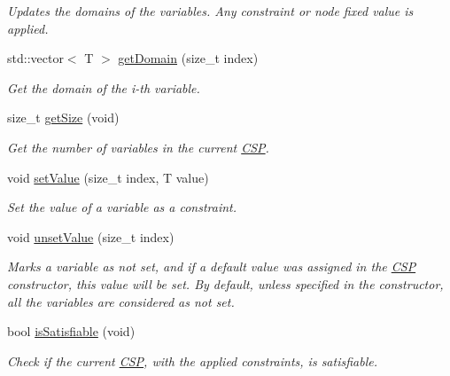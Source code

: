 \begin{DoxyCompactItemize}
\begin{DoxyCompactList}\small\item\em Updates the domains of the variables. Any constraint or node fixed value is applied. \item\end{DoxyCompactList}\item 
std::vector$<$ T $>$ \hyperlink{classCSP_a2a9a7d8072613f6984795d5495373847}{getDomain} (size\_\-t index)
\begin{DoxyCompactList}\small\item\em Get the domain of the i-\/th variable. \item\end{DoxyCompactList}\item 
size\_\-t \hyperlink{classCSP_a91a0e89bc1882d39b88122bee392c5f3}{getSize} (void)
\begin{DoxyCompactList}\small\item\em Get the number of variables in the current \hyperlink{classCSP}{CSP}. \item\end{DoxyCompactList}\item 
void \hyperlink{classCSP_ac25064c5b2d4e1020173b56913251ebd}{setValue} (size\_\-t index, T value)
\begin{DoxyCompactList}\small\item\em Set the value of a variable as a constraint. \item\end{DoxyCompactList}\item 
void \hyperlink{classCSP_a4c0cae125a610f519dc22eaec255a0ae}{unsetValue} (size\_\-t index)
\begin{DoxyCompactList}\small\item\em Marks a variable as not set, and if a default value was assigned in the \hyperlink{classCSP}{CSP} constructor, this value will be set. By default, unless specified in the constructor, all the variables are considered as not set. \item\end{DoxyCompactList}\item 
bool \hyperlink{classCSP_a7ef9eb91c38815c9d82182696a6bd5d3}{isSatisfiable} (void)
\begin{DoxyCompactList}\small\item\em Check if the current \hyperlink{classCSP}{CSP}, with the applied constraints, is satisfiable. \item\end{DoxyCompactList}\item 

\end{DoxyCompactItemize}
